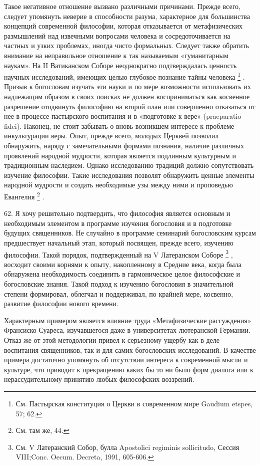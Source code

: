 \documentclass[a5paper,10pt]{article}
\begin{document}
Такое негативное отношение вызвано различными причинами. Прежде всего, следует
упомянуть неверие в способности разума, характерное для большинства концепций
современной философии, которая отказывается от метафизических размышлений над
извечными вопросами человека и сосредоточивается на частных и узких проблемах,
иногда чисто формальных. Следует также обратить внимание на неправильное
отношение к так называемым «гуманитарным наукам». На II Ватиканском Соборе
неоднократно подтверждалась ценность научных исследований, имеющих целью
глубокое познание тайны человека \footnote{См. Пастырская конституция о Церкви
в современном мире Gaudium etspes, 57; 62.} . Призыв к богословам изучать эти
науки и по мере возможности использовать их надлежащим образом в своих поисках
не должен восприниматься как косвенное разрешение отодвинуть философию на
второй план или совершенно отказаться от нее в процессе пастырского воспитания
и в «подготовке к вере» (praeparatio fidei). Наконец, не стоит забывать о вновь
возникшем интересе к проблеме инкультурации веры. Опыт, прежде всего, молодых
Церквей позволил обнаружить, наряду с замечательными формами познания, наличие
различных проявлений народной мудрости, которая является подлинным культурным и
традиционным наследием. Однако исследованию традиций должно сопутствовать
изучение философии. Такие исследования позволят обнаружить ценные элементы
народной мудрости и создать необходимые узы между ними и проповедью Евангелия
\footnote{См. там же, 44.} .

62. Я хочу решительно подтвердить, что философия является основным и
необходимым элементом в программе изучения богословия и в подготовке будущих
священников. Не случайно в программе семинарий богословским курсам предшествует
начальный этап, который посвящен, прежде всего, изучению философии. Такой
порядок, подтвержденный на V Латеранском Соборе \footnote{См. V Латеранский
Собор, булла Apostolici regiminis sollicitudo, Сессия VIII;Conc. Oecum.
Decreta, 1991, 605-606.} , восходит своими корнями к опыту, накопленному в
Средние века, когда была обнаружена необходимость соединить в гармоническое
целое философские и богословские знания. Такой подход к изучению богословия в
значительной степени формировал, облегчал и поддерживал, по крайней мере,
косвенно, развитие философии нового времени.

Характерным примером является влияние труда «Метафизические рассуждения»
Франсиско Суареса, изучавшегося даже в университетах лютеранской Германии.
Отказ же от этой методологии привел к серьезному ущербу как в деле воспитания
священников, так и для самих богословских исследований. В качестве примера
достаточно упомянуть об отсутствии интереса к современной мысли и культуре, что
приводит к прекращению каких бы то ни было форм диалога или к нерассудительному
принятию любых философских воззрений.
\end{document}
